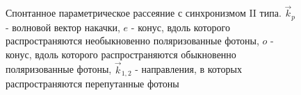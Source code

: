 \begin{figure}
\centering


\caption{Спонтанное параметрическое рассеяние с синхронизмом II
  типа. $\vec{k}_p$ - волновой вектор накачки, $e$ - конус,
  вдоль которого распространяются необыкновенно поляризованные фотоны,
  $o$ - конус, вдоль которого распространяются обыкновенно
  поляризованные фотоны, $\vec{k}_{1,2}$ -
  направления, в которых распространяются перепутанные фотоны}
\label{figEntangGen}
\end{figure}
